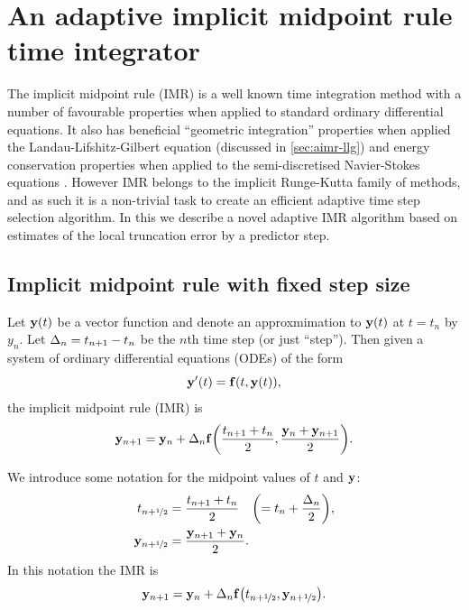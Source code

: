 


\chapter{An adaptive implicit midpoint rule time integrator}
\label{sec:adaptive-imr}


The implicit midpoint rule (IMR) is a well known time integration method with a number of favourable properties when applied to standard ordinary differential equations\cite[204]{HairerNorsettWanner}.
It also has beneficial ``geometric integration'' properties when applied the Landau-Lifshitz-Gilbert equation (discussed in \autoref{sec:aimr-llg}) and energy conservation properties when applied to the semi-discretised Navier-Stokes equations \cite{Sanderse2013}.
However IMR belongs to the implicit Runge-Kutta family of methods, and as such it is a non-trivial task to create an efficient adaptive time step selection algorithm.
In this \secpaper{} we describe a novel adaptive IMR algorithm based on estimates of the local truncation error by a predictor step.


\section{Implicit midpoint rule with fixed step size}
\label{sec:fixed-step-implicit}

Let $\mathbf{y}(t)$ be a vector function and denote an approxmimation to $\mathbf{y}(t)$ at $t = t_n$ by $y_n$.
Let $\Delta_{n} = t_{n+1} - t_n$ be the $n$th time step (or just ``step'').
Then given a system of ordinary differential equations (ODEs) of the form
\begin{equation}
  \mathbf{y}'(t) = {\mathbf{f}{\left( t, \mathbf{y}(t) \right)}},
  \label{eq:43}
\end{equation}
the implicit midpoint rule (IMR) is
\begin{equation}
    \mathbf{y}_{n+1} = \mathbf{y}_n + \Delta_{n} {\mathbf{f}{\left( \frac{t_{n+1} + t_n}{2}, \frac{\mathbf{y}_n + \mathbf{y}_{n+1}}{2} \right)}}.
\end{equation}

We introduce some notation for the midpoint values of $t$ and $\mathbf{y}$:
\begin{equation}
  \begin{aligned}
    t_{n+\nicefrac{1}{2}} & = \frac{t_{n+1} + t_n}{2} \quad {\left( = t_n + \frac{\Delta_{n}}{2} \right)}, \\
    \mathbf{y}_{n+\nicefrac{1}{2}} &= \frac{\mathbf{y}_{n+1} + \mathbf{y}_n}{2}.
  \end{aligned}
\end{equation}
In this notation the IMR is
\begin{equation}
  \mathbf{y}_{n+1} = \mathbf{y}_n + \Delta_{n} {\mathbf{f}{\left( t_{n+\nicefrac{1}{2}}, \mathbf{y}_{n+\nicefrac{1}{2}} \right)}}.
  \label{eq:basic-midpoint}
\end{equation}

